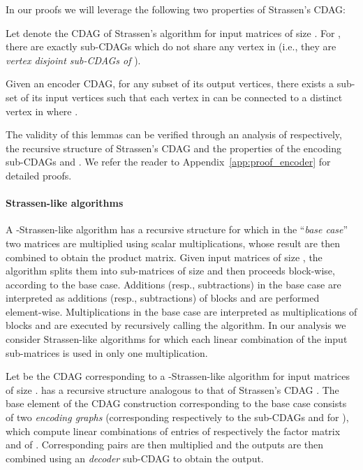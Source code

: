 \documentclass[a4paper,UKenglish]{lipics-v2016}
\begin{document}
In our proofs we will leverage the following two properties of Strassen's CDAG:
\begin{lemma}\label{lem:disictness_sub_cdag}
Let   denote the CDAG of Strassen's algorithm for input matrices of size . For , there are exactly  sub-CDAGs  which do not share any vertex in  (i.e., they are \emph{vertex disjoint sub-CDAGs of }).
\end{lemma}
\begin{lemma}\label{lem:conneconder}
Given an encoder CDAG, for any subset  of its output vertices, there exists a sub-set  of its input vertices such that each vertex in  can be connected to a distinct vertex in  where .
\end{lemma}

The validity of this lemmas can be verified through an analysis of respectively, the recursive structure of Strassen's CDAG and the properties of  the encoding sub-CDAGs  and . We refer the reader to Appendix~\ref{app:proof_encoder} for detailed proofs.

\paragraph*{Strassen-like algorithms}
A -Strassen-like algorithm has a recursive structure for
which in the ``\emph{base case}'' two  matrices are
multiplied using  scalar multiplications, whose result are then
combined to obtain the product matrix.  Given input matrices of size
, the algorithm splits them into  sub-matrices of
size  and then proceeds block-wise, according to
the base case. Additions (resp., subtractions) in the base case are
interpreted as additions (resp., subtractions) of blocks and are
performed element-wise. Multiplications in the base case are
interpreted as multiplications of blocks and are executed by
recursively calling the algorithm. In our analysis we consider
Strassen-like algorithms for which each linear combination of the
input sub-matrices is used in only one multiplication.

Let  be the CDAG corresponding to a -Strassen-like algorithm for input matrices of size
 .  has a recursive structure analogous
to that of Strassen's CDAG . The base element
 of the CDAG construction corresponding to the
base case consists of two \emph{encoding graphs} (corresponding
respectively to the sub-CDAGs  and  for ), which compute  linear combinations of entries of
respectively the factor matrix  and of . Corresponding pairs are
then multiplied and the outputs are then combined using an
\emph{decoder} sub-CDAG to obtain the output.
\end{document}
